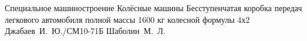 \documentclass{bmstu}
\begin{document}
\makecourseworktitle
    {Специальное машиностроение} %
    {Колёсные машины} %
    {Бесступенчатая коробка передач легкового автомобиля полной массы 1600 кг колесной формулы 4х2} %
    {Джабаев~И.~Ю./СМ10-71Б} %
    {Шаболин~М.~Л.} %
    {} %

\maketableofcontents










\makebibliography


\end{document}
